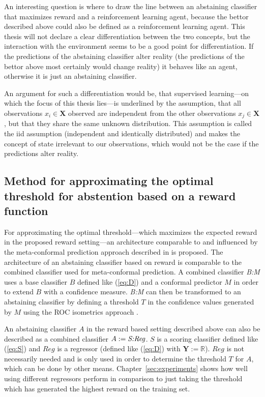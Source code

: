 \documentclass[twoside,11pt]{article}
\def\X{\textbf{X}}
\def\Y{\textbf{Y}}
\begin{document}
An interesting question is where to draw the line between
an abstaining classifier that maximizes reward and a
reinforcement learning agent, because the bettor described
above could also be defined as a reinforcement learning
agent.
This thesis will not declare a clear differentiation
between the two concepts, but the interaction with the
environment seems to be a good point for differentiation.
If the predictions of the abstaining classifier alter
reality (the predictions of the bettor above most certainly
would change reality) it behaves like an agent, otherwise
it is just an abstaining classifier.

An argument for such a differentiation would be, that
supervised learning---on which the focus of this thesis
lies---is underlined by the assumption, that all
observations $x_i \in \X$ observed are independent from the
other observations $x_j \in \X$, but that they share the
same unknown distribution.
This assumption is called the iid assumption (independent
and identically distributed) \citep[see][]{clauset_2011}
and makes the concept of state irrelevant to our
observations, which would not be the case if the
predictions alter reality.

\subsection{Method for approximating the optimal threshold
  for abstention based on a reward function}

For approximating the optimal threshold---which maximizes
the expected reward in the proposed reward setting---an
architecture comparable to and influenced by the
meta-confor\-mal prediction approach described in
\citet{smirnov_et_al_2009} is proposed.
The architecture of an abstaining classifier based on
reward is comparable to the combined classifier used for
meta-conformal prediction.
A combined classifier \textit{B:M} uses a base classifier
$B$ defined like (\ref{eq:D}) and a conformal predictor $M$
in order to extend $B$ with a confidence measure.
\textit{B:M} can then be transformed to an abstaining
classifier by defining a threshold $T$ in the confidence
values generated by $M$ using the ROC isometrics approach
\citep[see][]{smirnov_et_al_2009, vanderlooy_et_al_2009,
  fassbender_2019}.

An abstaining classifier $A$ in the reward based
setting described above can also be described as a
combined classifier $A := \text{\textit{S:Reg}}$.
$S$ is a scoring classifier defined like (\ref{eq:S}) and
$Reg$ is a regressor (defined like (\ref{eq:D}) with
$\Y := \mathbb{R}$).
$Reg$ is not necessarily needed and is only used in order
to determine the threshold $T$ for $A$, which can be done
by other means. Chapter~\ref{sec:experiments} shows how
well using different regressors perform in comparison to
just taking the threshold which has generated the highest
reward on the training set.
\end{document}

